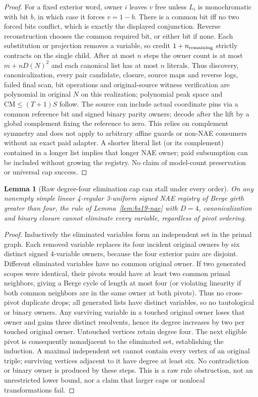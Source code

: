 \documentclass[11pt]{article}
\newtheorem{lemma}[theorem]{Lemma}
\begin{document}
\begin{proof}
For a fixed exterior word, owner $i$ leaves $v$ free unless $L_i$ is monochromatic with bit $b$, in which case it forces $v=1-b$. There is a common bit iff no two forced bits conflict, which is exactly the displayed conjunction. Reverse reconstruction chooses the common required bit, or either bit if none. Each substitution or projection removes a variable, so credit $1+n_{\rm remaining}$ strictly contracts on the single child. After at most $n$ steps the owner count is at most $m+nD(N)^2$ and each canonical list has at most $n$ literals. Thus discovery, canonicalization, every pair candidate, closure, source maps and reverse logs, failed final scan, bit operations and original-source witness verification are polynomial in original $N$ on this realization; polynomial peak space and $\mathrm{CM}\le(T+1)S$ follow. The source can include actual coordinate pins via a common reference bit and signed binary parity owners; decode after the lift by a global complement fixing the reference to zero. This relies on complement symmetry and does not apply to arbitrary affine guards or non-NAE consumers without an exact paid adapter. A shorter literal list (or its complement) contained in a longer list implies that longer NAE owner; paid subsumption can be included without growing the registry. No claim of model-count preservation or universal cap success.
\end{proof}
\begin{lemma}[Raw degree-four elimination cap can stall under every order]\label{lem:bs19-cap}
On any nonempty simple linear 4-regular 3-uniform signed NAE registry of Berge girth greater than four, the rule of Lemma~\ref{lem:bs19-nae} with $D=4$, canonicalization and binary closure cannot eliminate every variable, regardless of pivot ordering.
\end{lemma}
\begin{proof}
Inductively the eliminated variables form an independent set in the primal graph. Each removed variable replaces its four incident original owners by six distinct signed 4-variable owners, because the four exterior pairs are disjoint. Different eliminated variables have no common original owner. If two generated scopes were identical, their pivots would have at least two common primal neighbors, giving a Berge cycle of length at most four (or violating linearity if both common neighbors are in the same owner at both pivots). Thus no cross-pivot duplicate drops; all generated lists have distinct variables, so no tautological or binary owners. Any surviving variable in a touched original owner loses that owner and gains three distinct resolvents, hence its degree increases by two per touched original owner. Untouched vertices retain degree four. The next eligible pivot is consequently nonadjacent to the eliminated set, establishing the induction. A maximal independent set cannot contain every vertex of an original triple; surviving vertices adjacent to it have degree at least six. No contradiction or binary owner is produced by these steps. This is a raw rule obstruction, not an unrestricted lower bound, nor a claim that larger caps or nonlocal transformations fail.
\end{proof}
\end{document}
